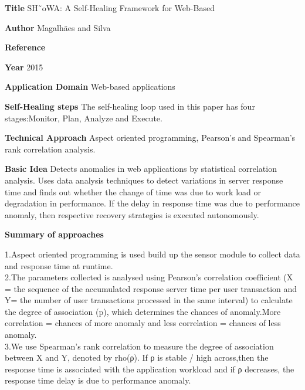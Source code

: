 \begin{compactitem}
\item[\textbf{Title}]SH˜oWA: A Self-Healing Framework for Web-Based

\item[\textbf{Author}]Magalhães and Silva 

\item[\textbf{Reference}]

\cite{magalhaes_showa:_2015}

\item[\textbf{Year}] 2015

\item[\textbf{Application Domain}]
Web-based applications 

\item[\textbf{Self-Healing steps}] 
The self-healing loop used in this paper has four stages:Monitor, Plan, Analyze and Execute.

\item[\textbf{Technical Approach}]Aspect oriented programming, Pearson's and Spearman's rank correlation analysis.

\item[\textbf{Basic Idea}] 
Detects anomalies in web applications by statistical correlation analysis. Uses data analysis techniques to detect variations in server response time and finds out whether the change of time was due to work load or degradation in performance. If the delay in response time was due to performance anomaly, then respective recovery strategies is executed autonomously.

\item[\textbf{Summary of approaches}] 

1.Aspect oriented programming is used build up the sensor module to collect data and response time at runtime.\\

2.The parameters collected is analysed using Pearson's correlation coefficient (X = the sequence of the accumulated response server time per user transaction and Y= the number of user transactions processed in the same interval) to calculate the degree of association (p), which determines  the chances of anomaly.More correlation = chances of more anomaly and less correlation = chances of less anomaly.\\

3.We use Spearman's rank correlation to measure the degree of association between X and Y, denoted by rho(ρ). If ρ is stable / high across,then the response time is associated with the application workload and if ρ decreases, the response time delay is due to performance anomaly.\\


\end{compactitem}
